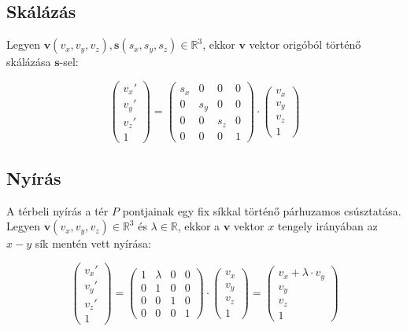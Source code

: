 \subsection{Skálázás}

Legyen $\mathbf{v}(v_x, v_y, v_z), \mathbf{s}(s_x, s_y, s_z)\in\mathbb{R}^3$, ekkor $\mathbf{v}$ vektor origóból történő skálázása $\mathbf{s}$-sel:

\[\left(\begin{array}{c}v_x' \\v_y' \\v_z' \\ 1 \end{array}\right) = \left(\begin{array}{cccc}s_x & 0 & 0 & 0\\0 & s_y & 0 & 0\\ 0 & 0 & s_z & 0\\ 0 & 0 & 0 & 1\end{array}\right) \cdot \left(\begin{array}{c}v_x\\ v_y\\ v_z\\ 1\end{array}\right)\]

\subsection{Nyírás}

A térbeli nyírás a tér $P$ pontjainak egy fix síkkal történő párhuzamos csúsztatása. Legyen $\mathbf{v}(v_x, v_y, v_z)\in\mathbb{R}^3$ és $\lambda\in\mathbb{R}$, ekkor a $\mathbf{v}$ vektor $x$ tengely irányában az $x-y$ sík mentén vett nyírása:

\[\left(\begin{array}{c}v_x' \\v_y' \\v_z' \\ 1 \end{array}\right) = \left(\begin{array}{cccc}1 & \lambda & 0 & 0\\0 & 1 & 0 & 0\\ 0 & 0 & 1 & 0\\ 0 & 0 & 0 & 1\end{array}\right) \cdot \left(\begin{array}{c}v_x\\ v_y\\ v_z\\ 1\end{array}\right) = \left(\begin{array}{c}v_x + \lambda\cdot v_y\\ v_y\\ v_z\\ 1\end{array}\right)\]

